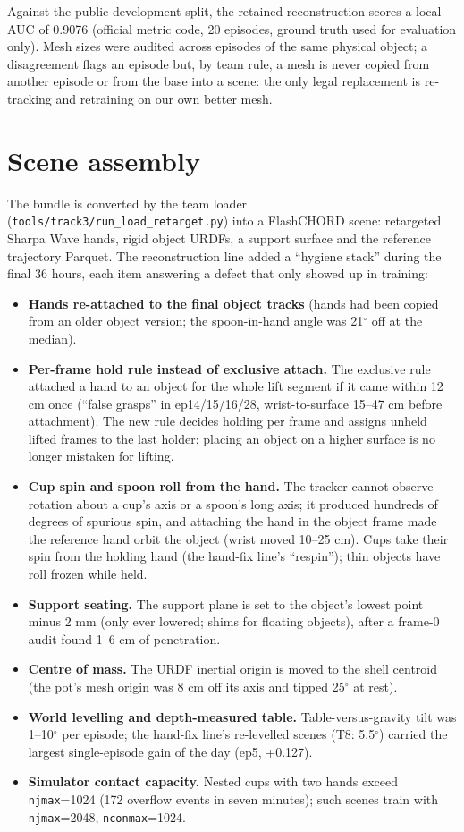 \documentclass[10pt,a4paper]{article}
\newcommand{\code}[1]{\texttt{#1}}
\begin{document}
Against the public development split, the retained reconstruction scores a local AUC of 0.9076 (official metric code, 20 episodes, ground truth used for evaluation only). Mesh sizes were audited across episodes of the same physical object; a disagreement flags an episode but, by team rule, a mesh is never copied from another episode or from the base into a scene: the only legal replacement is re-tracking and retraining on our own better mesh.

\section{Scene assembly}
\label{sec:scene}

The bundle is converted by the team loader (\code{tools/track3/run\_load\_retarget.py}) into a FlashCHORD scene: retargeted Sharpa Wave hands, rigid object URDFs, a support surface and the reference trajectory Parquet. The reconstruction line added a ``hygiene stack'' during the final 36 hours, each item answering a defect that only showed up in training:

\begin{itemize}
\item \textbf{Hands re-attached to the final object tracks} (hands had been copied from an older object version; the spoon-in-hand angle was 21$^\circ$ off at the median).
\item \textbf{Per-frame hold rule instead of exclusive attach.} The exclusive rule attached a hand to an object for the whole lift segment if it came within 12 cm once (``false grasps'' in ep14/15/16/28, wrist-to-surface 15--47 cm before attachment). The new rule decides holding per frame and assigns unheld lifted frames to the last holder; placing an object on a higher surface is no longer mistaken for lifting.
\item \textbf{Cup spin and spoon roll from the hand.} The tracker cannot observe rotation about a cup's axis or a spoon's long axis; it produced hundreds of degrees of spurious spin, and attaching the hand in the object frame made the reference hand orbit the object (wrist moved 10--25 cm). Cups take their spin from the holding hand (the hand-fix line's ``respin''); thin objects have roll frozen while held.
\item \textbf{Support seating.} The support plane is set to the object's lowest point minus 2 mm (only ever lowered; shims for floating objects), after a frame-0 audit found 1--6 cm of penetration.
\item \textbf{Centre of mass.} The URDF inertial origin is moved to the shell centroid (the pot's mesh origin was 8 cm off its axis and tipped 25$^\circ$ at rest).
\item \textbf{World levelling and depth-measured table.} Table-versus-gravity tilt was 1--10$^\circ$ per episode; the hand-fix line's re-levelled scenes (T8: 5.5$^\circ$) carried the largest single-episode gain of the day (ep5, +0.127).
\item \textbf{Simulator contact capacity.} Nested cups with two hands exceed \code{njmax}=1024 (172 overflow events in seven minutes); such scenes train with \code{njmax}=2048, \code{nconmax}=1024.
\end{itemize}
\end{document}
